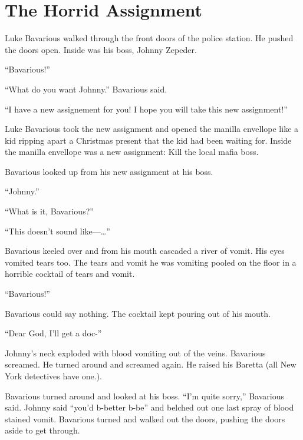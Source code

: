 \chapter{The Horrid Assignment}





Luke Bavarious walked through the front doors of the police
station. He pushed the doors open. Inside was his boss, Johnny
Zepeder.



``Bavarious!''

``What do you want Johnny.'' Bavarious said.

``I have a new assignement for you! I hope you will take this new
assignment!''



Luke Bavarious took the new assignment and opened the manilla
envellope like a kid ripping apart a Christmas present that the kid
had been waiting for. Inside the manilla envellope was a new
assignment: Kill the local mafia boss.



Bavarious looked up from his new assignment at his boss.

``Johnny.''



``What is it, Bavarious?''

``This doesn't sound like---{\ldots}''



Bavarious keeled over and from his mouth cascaded a river of vomit.
His eyes vomited tears too. The tears and vomit he was vomiting
pooled on the floor in a horrible cocktail of tears and
vomit.



``Bavarious!''



Bavarious could say nothing. The cocktail kept pouring out of his
mouth.



``Dear God, I'll get a doc-''



Johnny's neck exploded with blood vomiting out of the veins.
Bavarious screamed. He turned around and screamed again. He raised
his Baretta (all New York detectives have one.).



Bavarious turned around and looked at his boss. ``I'm quite sorry,''
Bavarious said. Johnny said ``you'd b-better b-be'' and belched out
one last spray of blood stained vomit. Bavarious turned and walked
out the doors, pushing the doors aside to get through.



